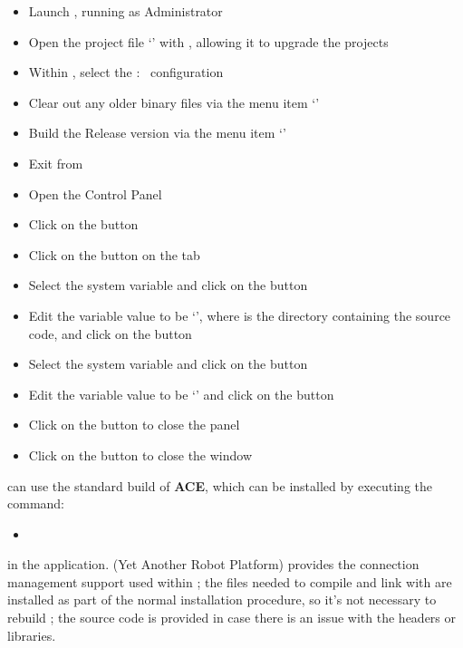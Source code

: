 \begin{itemize}
\item Launch , running as Administrator
\item\exSp{}Open the project file
`' with , allowing it to upgrade the
projects
\item\exSp{}Within , select the  :\ 
configuration
\item\exSp{}Clear out any older binary files via the menu item
`'
\item\exSp{}Build the Release version via the menu item
`'
\item\exSp{}Exit from 
\item\exSp{}Open the  Control Panel
\item\exSp{}Click on the  button
\item\exSp{}Click on the  button on the 
tab
\item\exSp{}Select the  system variable and click on the
 button 
\item\exSp{}Edit the variable value to be
`', where 
is the directory containing the \mplusm{} source code, and click on the  button
\item\exSp{}Select the  system variable and click on
the  button 
\item\exSp{}Edit the variable value to be
`' and
click on the  button
\item\exSp{}Click on the  button to close the 
panel
\item\exSp{}Click on the  button to close the 
window
\end{itemize}
\tertiaryEnd
{}
\mplusm{} can use the standard build of \textbf{ACE}, which can be installed by executing
the command:
\begin{itemize}
\item {}
\end{itemize}
in the  application.
\tertiaryEnd
\secondaryEnd
{}
\textbf{\yarp} (Yet Another Robot Platform) provides the connection management support
used within \mplusm; the files needed to compile and link with \yarp{} are installed as
part of the normal \mplusm{} installation procedure, so it's not necessary to rebuild
\yarp{}; the source code is provided in case there is an issue with the headers or
libraries.\\

